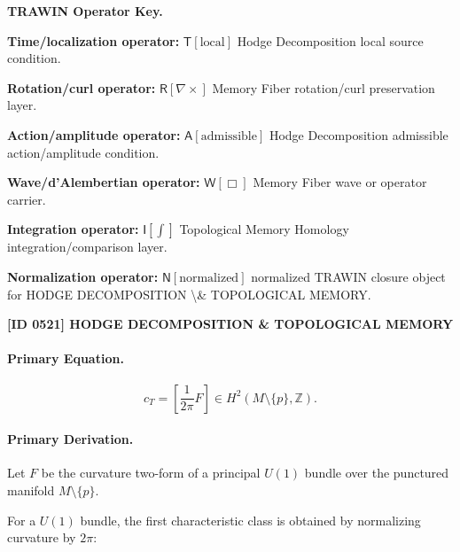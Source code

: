 \par\vspace{0.45\baselineskip}
\noindent\begin{minipage}[t]{\linewidth}
\begingroup
\small
\raggedright
\textbf{TRAWIN Operator Key.}\par
\noindent\textbf{Time/localization operator:} $\mathsf{T}\!\left[\mathrm{local}\right]$ Hodge Decomposition local source condition.\par
\noindent\textbf{Rotation/curl operator:} $\mathsf{R}\!\left[\nabla\times\right]$ Memory Fiber rotation/curl preservation layer.\par
\noindent\textbf{Action/amplitude operator:} $\mathsf{A}\!\left[\mathrm{admissible}\right]$ Hodge Decomposition admissible action/amplitude condition.\par
\noindent\textbf{Wave/d'Alembertian operator:} $\mathsf{W}\!\left[\Box\right]$ Memory Fiber wave or operator carrier.\par
\noindent\textbf{Integration operator:} $\mathsf{I}\!\left[\int\right]$ Topological Memory Homology integration/comparison layer.\par
\noindent\textbf{Normalization operator:} $\mathsf{N}\!\left[\mathrm{normalized}\right]$ normalized TRAWIN closure object for HODGE DECOMPOSITION \textbackslash{}\& TOPOLOGICAL MEMORY.\par
\endgroup
\end{minipage}

\clearpage
\noindent\textbf{[ID 0521] HODGE DECOMPOSITION \& TOPOLOGICAL MEMORY}\par
\vspace{0.35em}
\paragraph{Primary Equation.}
\begin{equation}
c_T
=
\left[
\frac{1}{2\pi}F
\right]
\in
H^2(M\setminus\{p\},\mathbb{Z}) .
\end{equation}

\paragraph{Primary Derivation.}
Let $F$ be the curvature two-form of a principal $U(1)$ bundle over the punctured manifold $M\setminus\{p\}$.

For a $U(1)$ bundle, the first characteristic class is obtained by normalizing curvature by $2\pi$:

